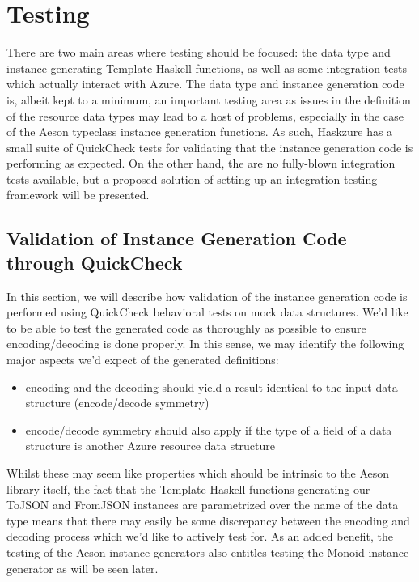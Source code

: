 \documentclass[11pt]{report}
\begin{document}
\chapter{Testing}

There are two main areas where testing should be focused: the data type and instance
generating Template Haskell functions, as well as some integration tests
which actually interact with Azure. \newline
The data type and instance generation code is, albeit kept to a minimum, an
important testing area as issues in the definition of the resource data types
may lead to a host of problems, especially in the case of the Aeson typeclass
instance generation functions. As such, Haskzure has a small suite of QuickCheck
tests for validating that the instance generation code is performing as
expected. \newline
On the other hand, the are no fully-blown integration tests available, but a
proposed solution of setting up an integration testing framework will be
presented.

\section{Validation of Instance Generation Code through QuickCheck}

In this section, we will describe how validation of the instance generation
code is performed using QuickCheck behavioral tests on mock data structures.
We'd like to be able to test the generated code as thoroughly as
possible to ensure encoding/decoding is done properly. In this sense, we may
identify the following major aspects we'd expect of the generated definitions:

\begin{itemize}
    \item{} encoding and the decoding should yield a result identical to the
        input data structure (encode/decode symmetry)
    \item{} encode/decode symmetry should also apply if the type of a field of
        a data structure is another Azure resource data structure
\end{itemize}

Whilst these may seem like properties which should be intrinsic to the Aeson
library itself, the fact that the Template Haskell functions generating our
ToJSON and FromJSON instances are parametrized over the name of the data type
means that there may easily be some discrepancy between the encoding and
decoding process which we'd like to actively test for. As an added benefit,
the testing of the Aeson instance generators also entitles testing the Monoid
instance generator as will be seen later.
\end{document}
